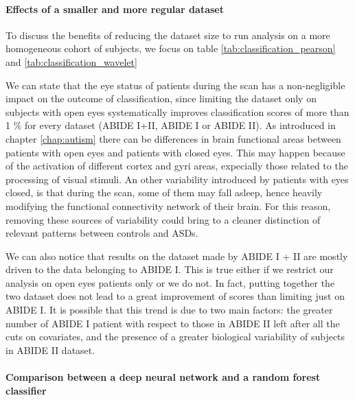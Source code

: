 \documentclass[11pt]{report}
\begin{document}
\paragraph{Effects of a smaller and more regular dataset}\hfill

To discuss the benefits of reducing the dataset size to run analysis on a more homogeneous cohort of subjects, we focus on table \ref{tab:classification_pearson} and \ref{tab:classification_wavelet} 

We can state that the eye status of patients during the scan has a non-negligible impact on the outcome of classification, since limiting the dataset only on subjects with open eyes systematically improves classification scores of more than 1 \% for every dataset (ABIDE I+II, ABIDE I or ABIDE II).
As introduced in chapter \ref{chap:autism} there can be differences in brain functional areas between patients with open eyes and patients with closed eyes.
This may happen because of the activation of different cortex and gyri areas, expecially those related to the processing of visual stimuli. 
An other variability introduced by patients with eyes closed, is that during the scan, some of them may fall asleep, hence heavily modifying the functional connectivity network of their brain.
For this reason, removing these sources of variability could bring to a cleaner distinction of relevant patterns between controls and ASDs.

We can also notice that results on the dataset made by ABIDE I + II are mostly driven to the data belonging to ABIDE I.
This is true either if we restrict our analysis on open eyes patients only or we do not.
In fact, putting together the two dataset does not lead to a great improvement of scores than limiting just on ABIDE I.
It is possible that this trend is due to two main factors: the greater number of ABIDE I patient with respect to those in ABIDE II left after all the cuts on covariates, and the presence of a greater biological variability of subjects in ABIDE II dataset.

\paragraph{Comparison between a deep neural network and a random forest classifier}
\end{document}

